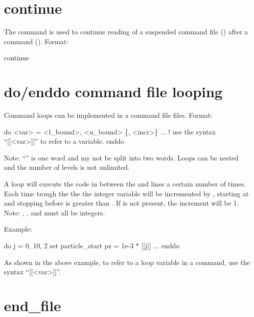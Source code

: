 \section{continue}
\label{s:continue}

The  command is used to continue reading of a suspended command file
() after a  command (). Format:
\begin{example}
  continue
\end{example}

\section{do/enddo command file looping}
\label{s:do}

Command loops can be implemented in a command file files. Format:
\begin{example}
  do <var> = <l_bound>, <u_bound> \{, <incr>\}
    ...   ! use the syntax ``[[<var>]]'' to refer to a variable.
  enddo
\end{example}
Note: ``'' is one word and my not be split into two words.
Loops can be nested and the number of levels is not unlimited. 

A loop will execute the code in between the  and  lines a certain number of
times. Each time trough the the the integer variable  will be incremented by ,
starting at  and stopping before  is greater than . If
 is not present, the increment will be 1. Note: , , and
 must all be integers.

Example:
\begin{example}
  do j = 0, 10, 2
    set particle_start pz = 1e-3 * [[j]]
    ...
  enddo
\end{example}
As shown in the above example, to refer to a loop variable in a command, use the syntax ``[[<var>]]''.

\section{end_file} \label{s:end.file}

